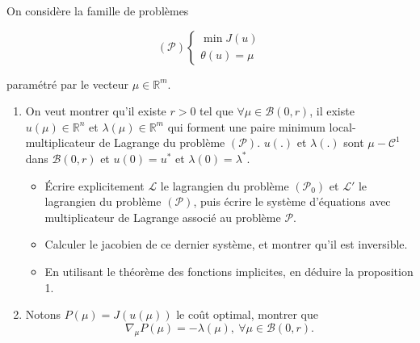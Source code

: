 \documentclass[11pt, a4paper]{article}
\begin{document}
On considère la famille de problèmes 

\begin{equation*}
(\mathcal{P})
\left\lbrace
\begin{array}{c}
\min J(u)\\
\theta (u) = \mu
\end{array}
\right.
\end{equation*}

paramétré par le vecteur $\mu \in \mathbb{R}^m$.


\begin{enumerate}
\item On veut montrer qu'il existe $r>0$ tel que $\forall \mu \in \mathcal{B}(0,r)$, il existe $u(\mu) \in \mathbb{R}^n$ et $\lambda(\mu) \in \mathbb{R}^m$ qui forment une paire minimum local-multiplicateur de Lagrange du problème $(\mathcal{P})$. $u(.)$ et $\lambda(.)$ sont $\mu-\mathcal{C}^1$ dans $\mathcal{B}(0,r)$ et $u(0)=u^*$ et $\lambda(0) = \lambda^*$.
\begin{itemize}
 \item \'Ecrire explicitement $\mathcal{L}$ le lagrangien du problème $(\mathcal{P}_0)$ et
 $\mathcal{L}'$ le lagrangien du problème $(\mathcal{P})$, puis écrire le système d'équations 
 avec multiplicateur de Lagrange associé au problème $\mathcal{P}$.
 \item Calculer le jacobien de ce dernier système, et montrer qu'il est inversible.
 \item En utilisant le théorème des fonctions implicites, en déduire la proposition 1.
\end{itemize}

\item Notons $P(\mu) = J(u(\mu))$ le coût optimal, montrer que
$$ \nabla_{\mu} P(\mu) = -\lambda(\mu) , ~ \forall \mu \in \mathcal{B}(0,r).$$
\end{enumerate}
\end{document}
